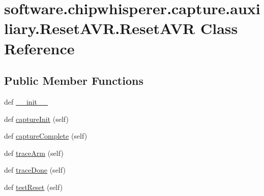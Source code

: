 \hypertarget{classsoftware_1_1chipwhisperer_1_1capture_1_1auxiliary_1_1ResetAVR_1_1ResetAVR}{}\section{software.\+chipwhisperer.\+capture.\+auxiliary.\+Reset\+A\+V\+R.\+Reset\+A\+V\+R Class Reference}
\label{classsoftware_1_1chipwhisperer_1_1capture_1_1auxiliary_1_1ResetAVR_1_1ResetAVR}
\subsection*{Public Member Functions}
\begin{DoxyCompactItemize}
\item 
def \hyperlink{classsoftware_1_1chipwhisperer_1_1capture_1_1auxiliary_1_1ResetAVR_1_1ResetAVR_a3f4394a942daac9dfdd4bd5e103bdacd}{\+\_\+\+\_\+init\+\_\+\+\_\+}
\item 
def \hyperlink{classsoftware_1_1chipwhisperer_1_1capture_1_1auxiliary_1_1ResetAVR_1_1ResetAVR_a92c8cf933859a9abee2798dec1b00d4d}{capture\+Init} (self)
\item 
def \hyperlink{classsoftware_1_1chipwhisperer_1_1capture_1_1auxiliary_1_1ResetAVR_1_1ResetAVR_aa876a60dcc3c15c19add481e3471583b}{capture\+Complete} (self)
\item 
def \hyperlink{classsoftware_1_1chipwhisperer_1_1capture_1_1auxiliary_1_1ResetAVR_1_1ResetAVR_a4add95ad4601057a4d4d6a6ee895ccec}{trace\+Arm} (self)
\item 
def \hyperlink{classsoftware_1_1chipwhisperer_1_1capture_1_1auxiliary_1_1ResetAVR_1_1ResetAVR_a7ab0719a07ff08912325f77c9101f74a}{trace\+Done} (self)
\item 
def \hyperlink{classsoftware_1_1chipwhisperer_1_1capture_1_1auxiliary_1_1ResetAVR_1_1ResetAVR_aa5571ea575309e6a828225047d6f84bf}{test\+Reset} (self)
\end{DoxyCompactItemize}


